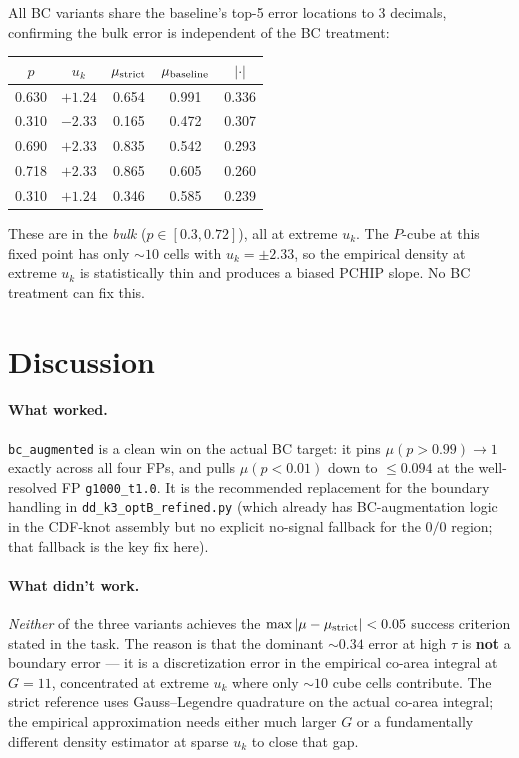 \documentclass[11pt]{article}
\begin{document}
All BC variants share the baseline's top-5 error locations to 3 decimals,
confirming the bulk error is independent of the BC treatment:
\begin{center}\small
\begin{tabular}{ccccc}
\toprule
$p$ & $u_k$ & $\mu_{\rm strict}$ & $\mu_{\rm baseline}$ & $|\cdot|$ \\
\midrule
0.630 & $+1.24$ & 0.654 & 0.991 & 0.336 \\
0.310 & $-2.33$ & 0.165 & 0.472 & 0.307 \\
0.690 & $+2.33$ & 0.835 & 0.542 & 0.293 \\
0.718 & $+2.33$ & 0.865 & 0.605 & 0.260 \\
0.310 & $+1.24$ & 0.346 & 0.585 & 0.239 \\
\bottomrule
\end{tabular}
\end{center}
These are in the \emph{bulk} ($p\in[0.3, 0.72]$), all at extreme $u_k$. The
$P$-cube at this fixed point has only $\sim\!10$ cells with $u_k=\pm 2.33$, so
the empirical density at extreme $u_k$ is statistically thin and produces a
biased PCHIP slope. No BC treatment can fix this.

\section{Discussion}

\paragraph{What worked.}
\texttt{bc\_augmented} is a clean win on the actual BC target: it pins
$\mu(p>0.99)\to 1$ exactly across all four FPs, and pulls $\mu(p<0.01)$ down
to $\!\leq 0.094$ at the well-resolved FP \texttt{g1000\_t1.0}. It is the
recommended replacement for the boundary handling in
\texttt{dd\_k3\_optB\_refined.py} (which already has BC-augmentation logic in
the CDF-knot assembly but no explicit no-signal fallback for the
$0/0$ region; that fallback is the key fix here).

\paragraph{What didn't work.}
\emph{Neither} of the three variants achieves the
$\text{max}\,|\mu-\mu_{\rm strict}|<0.05$ success criterion stated in the
task. The reason is that the dominant ${\sim}0.34$ error at high $\tau$ is
\textbf{not} a boundary error --- it is a discretization error in the
empirical co-area integral at $G=11$, concentrated at extreme $u_k$ where
only $\sim\!10$ cube cells contribute. The strict reference uses Gauss--Legendre
quadrature on the actual co-area integral; the empirical approximation needs
either much larger $G$ or a fundamentally different density estimator at
sparse $u_k$ to close that gap.
\end{document}
